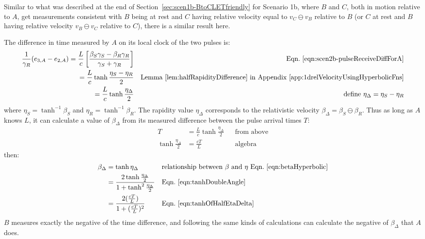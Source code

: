 \documentclass[a4paper]{article}
\theoremstyle{plain}
\theoremstyle{definition}
\begin{document}
Similar to what was described at the end of
Section~\ref{sec:scen1b-BtoCLETfriendly} for Scenario 1b, where $B$
and $C$, both in motion relative to $A$, get measurements consistent
with $B$ being at rest and $C$ having relative velocity equal to
$v_C \ominus v_B$ relative to $B$ (or $C$ at rest and $B$ having
relative velocity $v_B \ominus v_C$ relative to $C$), there is a
similar result here.

The difference in time measured by $A$ on its local clock of the two
pulses is:
\begin{align*}
\frac{1}{\gamma_R} (e_{3,A}-e_{2,A})
  = \frac{L}{c} \left[ \frac{\beta_S\gamma_S - \beta_R\gamma_R}{\gamma_S + \gamma_R} \right] & & \text{Eqn.~\eqref{eqn:scen2b-pulseReceiveDiffForA}} \\
  = \frac{L}{c} \tanh \frac{\eta_S-\eta_R}{2} & & \text{Lemma~\ref{lem:halfRapidityDifference} in Appendix~\ref{app:1drelVelocityUsingHyperbolicFns}} \\
  = \frac{L}{c} \tanh \frac{\eta_{\Delta}}{2} & & \text{define $\eta_{\Delta}=\eta_S-\eta_R$}
\end{align*}
where $\eta_S = \tanh^{-1} \beta_S$ and $\eta_R = \tanh^{-1} \beta_R$.
The rapidity value $\eta_{\Delta}$ corresponds to the relativistic
velocity $\beta_{\Delta} = \beta_S \ominus \beta_R$.  Thus as long as
$A$ knows $L$, it can calculate a value of $\beta_{\Delta}$ from
its measured difference between the pulse arrival times $T$:
\begin{align}
T & = \frac{L}{c} \tanh \frac{\eta_{\Delta}}{2} & & \text{from above} \nonumber \\
\tanh \frac{\eta_{\Delta}}{2} & = \frac{cT}{L} & & \text{algebra} \label{eqn:tanhOfHalfEtaDelta}
\end{align}
then:
\begin{align*}
\beta_{\Delta}
  & = \tanh \eta_{\Delta} & & \text{relationship between $\beta$ and $\eta$ Eqn.~\eqref{eqn:betaHyperbolic}} \\
  & = \frac{2\tanh \frac{\eta_{\Delta}}{2}}{1+\tanh^2 \frac{\eta_{\Delta}}{2}} & & \text{Eqn.~\eqref{eqn:tanhDoubleAngle}} \\
  & = \frac{2 (\frac{cT}{L})}{1+(\frac{cT}{L})^2} & & \text{Eqn.~\eqref{eqn:tanhOfHalfEtaDelta}} \\
\end{align*}
$B$ measures exactly the negative of the time difference, and
following the same kinds of calculations can calculate the negative of
$\beta_{\Delta}$ that $A$ does.
\end{document}
